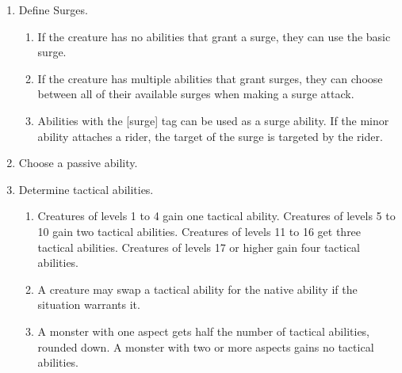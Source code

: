 \begin{enumerate}
\item Define Surges.
\begin{enumerate}
\item If the creature has no abilities that grant a surge, they can use the basic surge.
\item If the creature has multiple abilities that grant surges, they can choose between all of their available surges when making a surge attack.
\item Abilities with the [surge] tag can be used as a surge ability. If the minor ability attaches a rider, the target of the surge is targeted by the rider.
\end{enumerate}
\item Choose a passive ability.
\item Determine tactical abilities.
\begin{enumerate}
\item Creatures of levels 1 to 4 gain one tactical ability. Creatures of levels 5 to 10 gain two tactical abilities. Creatures of levels 11 to 16 get three tactical abilities. Creatures of levels 17 or higher gain four tactical abilities.
\item A creature may swap a tactical ability for the native ability if the situation warrants it.
\item A monster with one aspect gets half the number of tactical abilities, rounded down. A monster with two or more aspects gains no tactical abilities.
\end{enumerate}
\end{enumerate}

